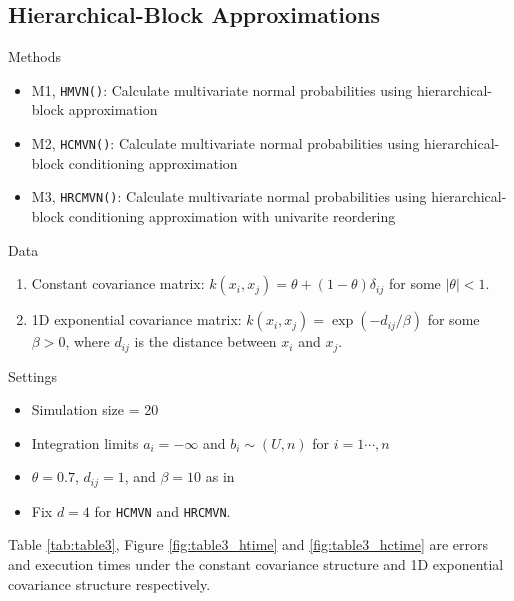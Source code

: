 \subsection{Hierarchical-Block Approximations}

\begin{frame}{\subsecname}

	\begin{block}{Methods}
		\begin{itemize}
			\item M1, \texttt{HMVN()}: Calculate multivariate normal probabilities using hierarchical-block approximation
			\item M2, \texttt{HCMVN()}: Calculate multivariate normal probabilities using hierarchical-block conditioning approximation
			\item M3, \texttt{HRCMVN()}: Calculate multivariate normal probabilities using hierarchical-block conditioning approximation with univarite reordering
		\end{itemize}
	\end{block}

	\begin{block}{Data}
		\begin{enumerate}
			\item Constant covariance matrix: $k(x_i, x_j) = \theta + (1-\theta)\delta_{ij}$ for some $|\theta| < 1$.
			\item 1D exponential covariance matrix: $k(x_i, x_j) = \exp(-d_{ij}/\beta)$ for some $\beta > 0$, where $d_{ij}$ is the distance between $x_i$ and $x_j$.
		\end{enumerate}
	\end{block}

\end{frame}

\begin{frame}{\subsecname}

	\begin{block}{Settings}
		\begin{itemize}
			\item Simulation size = 20
			\item Integration limits $a_i=-\infty$ and $b_i\sim(U,n)$ for $i=1\cdots,n$
			\item $\theta=0.7$, $d_{ij} = 1$, and $\beta=10$ as in \citet{cao2019hierarchical}
			\item Fix $d=4$ for \texttt{HCMVN} and \texttt{HRCMVN}.
		\end{itemize}
	\end{block}

	Table \ref{tab:table3}, Figure \ref{fig:table3_htime} and \ref{fig:table3_hctime} are errors and execution times under the constant covariance structure and 1D exponential covariance structure respectively. 
\end{frame}

